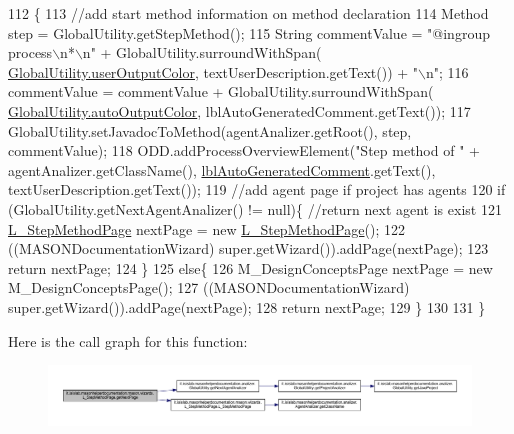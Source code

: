 \begin{DoxyCode}
112                                     \{ 
113         \textcolor{comment}{//add start method information on method declaration}
114         Method step = GlobalUtility.getStepMethod();
115         String commentValue = \textcolor{stringliteral}{"@ingroup process\(\backslash\)n*\(\backslash\)n"} + GlobalUtility.surroundWithSpan(
      \hyperlink{classit_1_1isislab_1_1masonhelperdocumentation_1_1analizer_1_1_global_utility_aec864cd710b27ece609c5a6093211ff4}{GlobalUtility.userOutputColor}, textUserDescription.getText()) + \textcolor{stringliteral}{"\(\backslash\)n"};
116         commentValue = commentValue + GlobalUtility.surroundWithSpan(
      \hyperlink{classit_1_1isislab_1_1masonhelperdocumentation_1_1analizer_1_1_global_utility_a42aa676ad1ff27c42cd4aab651ff2a35}{GlobalUtility.autoOutputColor}, lblAutoGeneratedComment.getText());
117         GlobalUtility.setJavadocToMethod(agentAnalizer.getRoot(), step, commentValue);
118         ODD.addProcessOverviewElement(\textcolor{stringliteral}{"Step method of "} + agentAnalizer.getClassName(), 
      \hyperlink{classit_1_1isislab_1_1masonhelperdocumentation_1_1mason_1_1wizards_1_1_l___step_method_page_af9b2ba2f488b5e92c1e8745127d3162c}{lblAutoGeneratedComment}.getText(), textUserDescription.getText());
119         \textcolor{comment}{//add agent page if project has agents}
120         \textcolor{keywordflow}{if} (GlobalUtility.getNextAgentAnalizer() != null)\{  \textcolor{comment}{//return next agent is exist}
121             \hyperlink{classit_1_1isislab_1_1masonhelperdocumentation_1_1mason_1_1wizards_1_1_l___step_method_page_ae63b8fc92a263e94bef137135e5f47da}{L\_StepMethodPage} nextPage = \textcolor{keyword}{new} \hyperlink{classit_1_1isislab_1_1masonhelperdocumentation_1_1mason_1_1wizards_1_1_l___step_method_page_ae63b8fc92a263e94bef137135e5f47da}{L\_StepMethodPage}();
122             ((MASONDocumentationWizard) super.getWizard()).addPage(nextPage);
123             \textcolor{keywordflow}{return} nextPage;
124         \}
125         \textcolor{keywordflow}{else}\{
126             M\_DesignConceptsPage nextPage = \textcolor{keyword}{new} M\_DesignConceptsPage();
127             ((MASONDocumentationWizard) super.getWizard()).addPage(nextPage);
128             \textcolor{keywordflow}{return} nextPage;
129         \}
130         
131     \}
\end{DoxyCode}


Here is the call graph for this function\-:\nopagebreak
\begin{figure}[H]
\begin{center}
\leavevmode
\includegraphics[width=350pt]{classit_1_1isislab_1_1masonhelperdocumentation_1_1mason_1_1wizards_1_1_l___step_method_page_a3aa5cb9ab01aceaa78dd1294d9e5f330_cgraph}
\end{center}
\end{figure}


